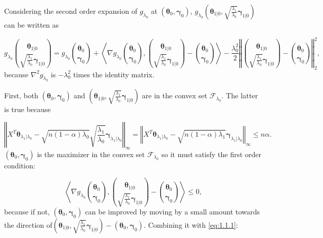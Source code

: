 Considering the second order expansion of $g_{\lambda_0}$ at $(\boldsymbol\theta_{0},\boldsymbol\gamma_{0})$, $g_{\lambda_0}\left(\boldsymbol\theta_{1|0},\sqrt{\frac{\lambda_1}{\lambda_0}}\boldsymbol\gamma_{1|0}\right)$ can be written as

\begin{equation}
    \label{eq:1.1.1}
    g_{\lambda_0}\binom{\boldsymbol\theta_{1|0}}{\sqrt{\frac{\lambda_1}{\lambda_0}}\boldsymbol\gamma_{1|0}}=g_{\lambda_0}\binom{\boldsymbol\theta_{0}}{\boldsymbol\gamma_{0}}+\left\langle\nabla g_{\lambda_0}\binom{\boldsymbol\theta_{0}}{\boldsymbol\gamma_{0}},\binom{\boldsymbol\theta_{1|0}}{\sqrt{\frac{\lambda_1}{\lambda_0}}\boldsymbol\gamma_{1|0}}-\binom{\boldsymbol\theta_{0}}{\boldsymbol\gamma_{0}}\right\rangle-\frac{\lambda_0^2}{2}\left\Vert\binom{\boldsymbol\theta_{1|0}}{\sqrt{\frac{\lambda_1}{\lambda_0}}\boldsymbol\gamma_{1|0}}-\binom{\boldsymbol\theta_{0}}{\boldsymbol\gamma_{0}}\right\Vert_2^2,
\end{equation}
because $\nabla^2g_{\lambda_0}$ is $-\lambda_0^2$ times the identity matrix. 

First, both $(\boldsymbol\theta_{0},\boldsymbol\gamma_{0})$ and $\left(\boldsymbol\theta_{1|0},\sqrt{\frac{\lambda_1}{\lambda_0}}\boldsymbol\gamma_{1|0}\right)$ are in the convex set $\mathcal{F}_{\lambda_0}$. The latter is true because

\begin{equation}
    \left\Vert X^T\boldsymbol\theta_{\lambda_1|\lambda_0}-\sqrt{n(1-\alpha)\lambda_0}\sqrt{\frac{\lambda_1}{\lambda_0}}\boldsymbol\gamma_{\lambda_1|\lambda_0}\right\Vert_\infty= \left\Vert X^T\boldsymbol\theta_{\lambda_1|\lambda_0}-\sqrt{n(1-\alpha)\lambda_1}\boldsymbol\gamma_{\lambda_1|\lambda_0}\right\Vert_\infty\leq n\alpha.
\end{equation}
$(\boldsymbol\theta_{0},\boldsymbol\gamma_{0})$ is the maximizer in the convex set $\mathcal{F}_{\lambda_0}$ so it must satisfy the first order condition:

\begin{equation}
    \label{eq:1.1.2}
    \left\langle\nabla g_{\lambda_0}\binom{\boldsymbol\theta_{0}}{\boldsymbol\gamma_{0}},\binom{\boldsymbol\theta_{1|0}}{\sqrt{\frac{\lambda_1}{\lambda_0}}\boldsymbol\gamma_{1|0}}-\binom{\boldsymbol\theta_{0}}{\boldsymbol\gamma_{0}}\right\rangle\leq 0,
\end{equation}
because if not, $(\boldsymbol\theta_{0},\boldsymbol\gamma_{0})$ can be improved by moving by a small amount towards the direction of\newline $\left(\boldsymbol\theta_{1|0},\sqrt{\frac{\lambda_1}{\lambda_0}}\boldsymbol\gamma_{1|0}\right)-(\boldsymbol\theta_{0},\boldsymbol\gamma_{0})$. Combining it with \eqref{eq:1.1.1}:

